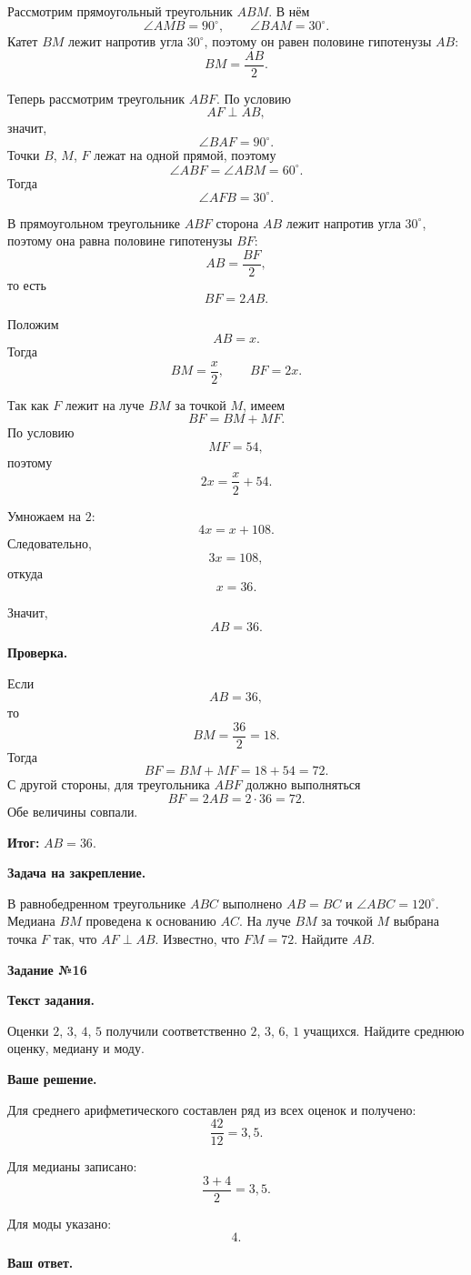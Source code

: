 \documentclass[12pt,a4paper]{article}
\newcommand{\tasktitle}[1]{%
  \phantomsection\label{task:#1}%
  {\LARGE\bfseries Задание №#1}\par
  \vspace{0.6em}
}
\begin{document}
Рассмотрим прямоугольный треугольник $ABM$. В нём
\[
\angle AMB=90^\circ,\qquad \angle BAM=30^\circ.
\]
Катет $BM$ лежит напротив угла $30^\circ$, поэтому он равен половине гипотенузы $AB$:
\[
BM=\frac{AB}{2}.
\]

Теперь рассмотрим треугольник $ABF$. По условию
\[
AF\perp AB,
\]
значит,
\[
\angle BAF=90^\circ.
\]
Точки $B$, $M$, $F$ лежат на одной прямой, поэтому
\[
\angle ABF=\angle ABM=60^\circ.
\]
Тогда
\[
\angle AFB=30^\circ.
\]

В прямоугольном треугольнике $ABF$ сторона $AB$ лежит напротив угла $30^\circ$, поэтому она равна половине гипотенузы $BF$:
\[
AB=\frac{BF}{2},
\]
то есть
\[
BF=2AB.
\]

Положим
\[
AB=x.
\]
Тогда
\[
BM=\frac{x}{2},
\qquad
BF=2x.
\]

Так как $F$ лежит на луче $BM$ за точкой $M$, имеем
\[
BF=BM+MF.
\]
По условию
\[
MF=54,
\]
поэтому
\[
2x=\frac{x}{2}+54.
\]

Умножаем на $2$:
\[
4x=x+108.
\]
Следовательно,
\[
3x=108,
\]
откуда
\[
x=36.
\]

Значит,
\[
AB=36.
\]

\textbf{Проверка.}

Если
\[
AB=36,
\]
то
\[
BM=\frac{36}{2}=18.
\]
Тогда
\[
BF=BM+MF=18+54=72.
\]
С другой стороны, для треугольника $ABF$ должно выполняться
\[
BF=2AB=2\cdot36=72.
\]
Обе величины совпали.

\textcolor{teal!60!black}{\textbf{Итог:}} $AB=36$.

\textbf{Задача на закрепление.}

В равнобедренном треугольнике $ABC$ выполнено $AB=BC$ и $\angle ABC=120^\circ$. Медиана $BM$ проведена к основанию $AC$. На луче $BM$ за точкой $M$ выбрана точка $F$ так, что $AF\perp AB$. Известно, что $FM=72$. Найдите $AB$.

\newpage
\tasktitle{16}

\textbf{Текст задания.}

Оценки $2$, $3$, $4$, $5$ получили соответственно $2$, $3$, $6$, $1$ учащихся. Найдите среднюю оценку, медиану и моду.

\textbf{Ваше решение.}

Для среднего арифметического составлен ряд из всех оценок и получено:
\[
\frac{42}{12}=3{,}5.
\]

Для медианы записано:
\[
\frac{3+4}{2}=3{,}5.
\]

Для моды указано:
\[
4.
\]

\textbf{Ваш ответ.}
\end{document}
